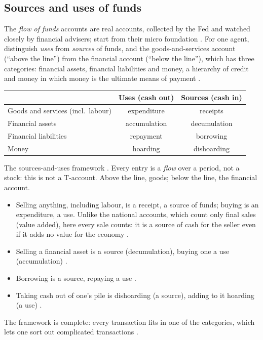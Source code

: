 \begin{paracol}{2}
\section{Sources and uses of funds}\label{sec:mv-su}

The \emph{flow of funds} accounts are real accounts, collected by the Fed and watched closely by financial advisers; start from their
micro foundation . For one agent, distinguish \emph{uses} from \emph{sources} of funds, and the goods-and-services
account (``above the line'') from the financial account (``below the line''), which has three categories: financial assets, financial
liabilities and money, a hierarchy of credit and money in which money is the ultimate means of payment .

\begin{nfigure}
\renewcommand{\arraystretch}{1.35}
\begin{tabular}{l|c|c}
 & \textbf{Uses} (cash out) & \textbf{Sources} (cash in)\\\hline
Goods and services (incl.\ labour) & expenditure & receipts\\\hline
Financial assets & accumulation & decumulation\\
Financial liabilities & repayment & borrowing\\
Money & hoarding & dishoarding\\
\end{tabular}
\caption{The sources-and-uses framework . Every entry is a \emph{flow} over a period, not a stock: this is not a
T-account. Above the line, goods; below the line, the financial account.}\label{fig:mv-su}
\end{nfigure}

\begin{itemize}
  \item Selling anything, including labour, is a receipt, a source of funds; buying is an expenditure, a use. Unlike the national
        accounts, which count only final sales (value added), here every sale counts: it is a source of cash for the seller even if it
        adds no value for the economy .
  \item Selling a financial asset is a source (decumulation), buying one a use (accumulation) .
  \item Borrowing is a source, repaying a use .
  \item Taking cash out of one's pile is dishoarding (a source), adding to it hoarding (a use) .
\end{itemize}
The framework is complete: every transaction fits in one of the categories, which lets one sort out complicated transactions
.


\end{paracol}
